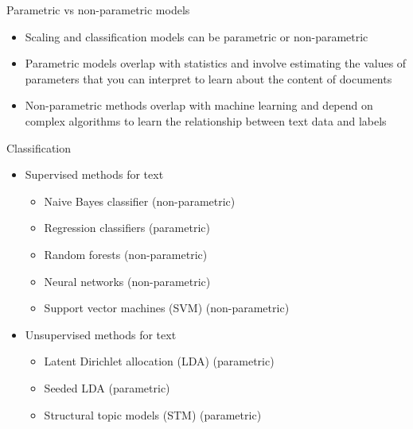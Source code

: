 \documentclass[pdf, 9pt, fleqn, handout]{beamer}
\begin{document}
\begin{frame}{Parametric vs non-parametric models}
\begin{itemize}
\item Scaling and classification models can be parametric or non-parametric \\[2em]
\item Parametric models overlap with statistics and involve estimating the values of parameters that you can interpret to learn about the content of documents \\[2em]
\item Non-parametric methods overlap with machine learning and depend on complex algorithms to learn the relationship between text data and labels
\end{itemize}
\end{frame}

\begin{frame}{Classification}
\begin{itemize}
\item Supervised methods for text \\[0.5em]
\begin{itemize}
\item Naive Bayes classifier (non-parametric) \\[0.5em]
\item Regression classifiers (parametric) \\[0.5em]
\item Random forests (non-parametric) \\[0.5em]
\item Neural networks (non-parametric) \\[0.5em]
\item Support vector machines (SVM) (non-parametric) \\[2em]
\end{itemize}
\item Unsupervised methods for text \\[0.5em]
\begin{itemize}
\item Latent Dirichlet allocation (LDA) (parametric) \\[0.5em]
\item Seeded LDA  (parametric) \\[0.5em]
\item Structural topic models (STM) (parametric)
\end{itemize} 
\end{itemize}
\end{frame}
\end{document}
